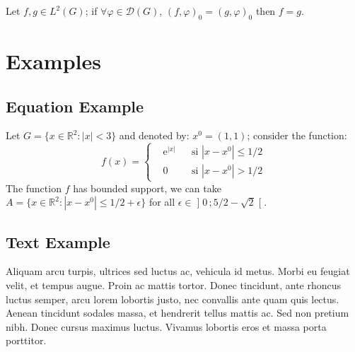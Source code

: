 \documentclass[
	11pt, %
	fleqn, %
	a4paper, %
]{LegrandOrangeBook}
\begin{document}
\begin{proposition} %
	Let $f,g\in L^2(G)$; if $\forall \varphi\in\mathcal{D}(G)$, $(f,\varphi)_0=(g,\varphi)_0$ then $f = g$.
\end{proposition}


\section{Examples}

\subsection{Equation Example}

\begin{example} %
	Let $G=\{x\in\mathbb{R}^2:|x|<3\}$ and denoted by: $x^0=(1,1)$; consider the function:
	\begin{equation}
		f(x)=\left\{\begin{aligned}                             & \mathrm{e}^{|x|} &  & \text{si $|x-x^0|\leq 1/2$} \\
                                            & 0                &  & \text{si $|x-x^0|> 1/2$}\end{aligned}\right.
	\end{equation}
	The function $f$ has bounded support, we can take $A=\{x\in\mathbb{R}^2:|x-x^0|\leq 1/2+\epsilon\}$ for all $\epsilon\in\mathopen{]}0\,;5/2-\sqrt{2}\mathclose{[}$.
\end{example}

\subsection{Text Example}

\begin{example}[Example name] %
	Aliquam arcu turpis, ultrices sed luctus ac, vehicula id metus. Morbi eu feugiat velit, et tempus augue. Proin ac mattis tortor. Donec tincidunt, ante rhoncus luctus semper, arcu lorem lobortis justo, nec convallis ante quam quis lectus. Aenean tincidunt sodales massa, et hendrerit tellus mattis ac. Sed non pretium nibh. Donec cursus maximus luctus. Vivamus lobortis eros et massa porta porttitor.
\end{example}
\end{document}
